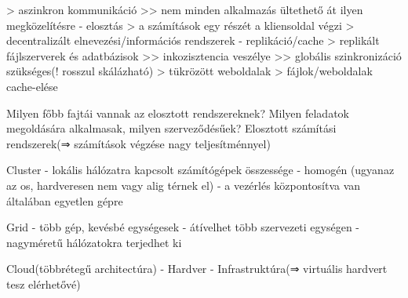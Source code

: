 \documentclass[twoside, a4paper, 12pt]{article}
\begin{document}
\begin{description}
                                                                        > aszinkron kommunikáció >> nem minden alkalmazás ültethető át ilyen megközelítésre
                                                                        - elosztás 
                                                                        > a számítások egy részét a kliensoldal végzi
                                                                        > decentralizált elnevezési/információs rendszerek
                                                                        - replikáció/cache
                                                                        > replikált fájlszerverek és adatbázisok >> inkozisztencia veszélye >> globális szinkronizáció szükséges(! rosszul skálázható)
                                                                        > tükrözött weboldalak
                                                                        > fájlok/weboldalak cache-elése
                                                                    \item  Milyen főbb fajtái vannak az elosztott rendszereknek? Milyen feladatok megoldására alkalmasak, milyen szerveződésűek?
                                                                        Elosztott számítási rendszerek(⇒ számítások végzése nagy teljesítménnyel)
                                                                    \item Cluster
                                                                        - lokális hálózatra kapcsolt számítógépek összessége 
                                                                        - homogén (ugyanaz az os, hardveresen nem vagy alig térnek el)
                                                                        - a vezérlés központosítva van általában egyetlen gépre
                                                                    \item Grid
                                                                        - több gép, kevésbé egységesek
                                                                        - átívelhet több szervezeti egységen 
                                                                        - nagyméretű hálózatokra terjedhet ki 
                                                                    \item Cloud(többrétegű architectúra)
                                                                        - Hardver
                                                                        - Infrastruktúra(⇒ virtuális hardvert tesz elérhetővé)

\end{description}
\end{document}
